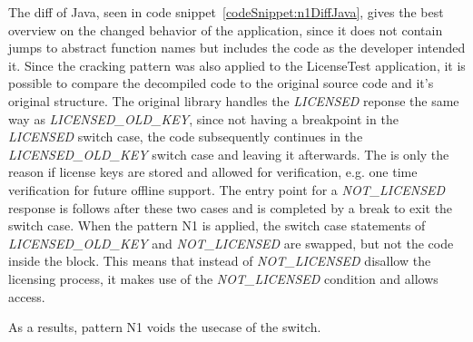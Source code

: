 The diff of Java, seen in code snippet~\ref{codeSnippet:n1DiffJava}, gives the best overview on the changed behavior of the application, since it does not contain jumps to abstract function names but includes the code as the developer intended it.
Since the cracking pattern was also applied to the LicenseTest application, it is possible to compare the decompiled code to the original source code and it's original structure.
The original library handles the \textit{LICENSED} reponse the same way as \textit{LICENSED\_OLD\_KEY}, since not having a breakpoint in the \textit{LICENSED} switch case, the code subsequently continues in the \textit{LICENSED\_OLD\_KEY} switch case and leaving it afterwards.
The is only the reason if license keys are stored and allowed for verification, e.g. one time verification for future offline support.
The entry point for a \textit{NOT\_LICENSED} response is follows after these two cases and is completed by a break to exit the switch case.
When the pattern N1 is applied, the switch case statements of \textit{LICENSED\_OLD\_KEY} and \textit{NOT\_LICENSED} are swapped, but not the code inside the block.
This means that instead of \textit{NOT\_LICENSED} disallow the licensing process, it makes use of the \textit{NOT\_LICENSED} condition and allows access.
\newline

As a results, pattern N1 voids the usecase of the switch.
